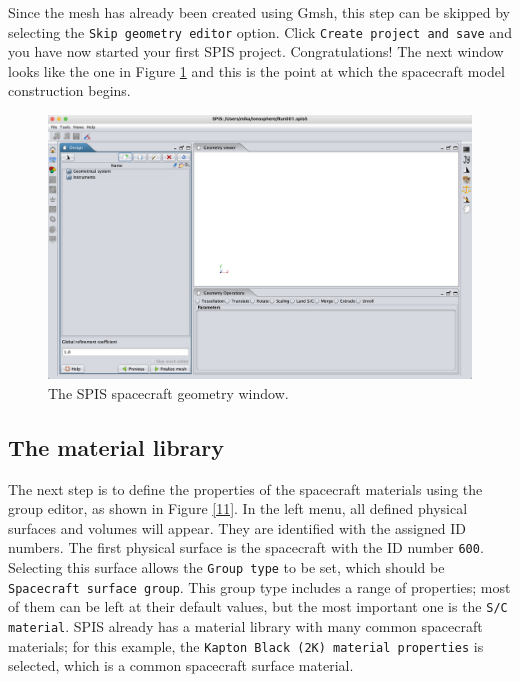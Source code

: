 \documentclass[a4paper, 12pt]{article}
\begin{document}
Since the mesh has already been created using Gmsh, this step can be skipped by selecting the \verb|Skip geometry editor| option. Click \verb|Create project and save| and you have now started your first SPIS project. Congratulations! The next window looks like the one in Figure \ref{10} and this is the point at which the spacecraft model construction begins.

\begin{figure}[!ht]
    \centering
    \includegraphics[width=1\textwidth]{fig10.jpg}
    \caption{The SPIS spacecraft geometry window.}
    \label{10}
\end{figure}

\subsection{The material library} %
\vspace{2mm}

The next step is to define the properties of the spacecraft materials using the group editor, as shown in Figure \ref{11}. In the left menu, all defined physical surfaces and volumes will appear. They are identified with the assigned ID numbers. The first physical surface is the spacecraft with the ID number \verb|600|. Selecting this surface allows the \verb|Group type| to be set, which should be \verb|Spacecraft surface group|. This group type includes a range of properties; most of them can be left at their default values, but the most important one is the \verb|S/C material|. SPIS already has a material library with many common spacecraft materials; for this example, the \verb|Kapton Black (2K) material properties| is selected, which is a common spacecraft surface material.\\
\end{document}

